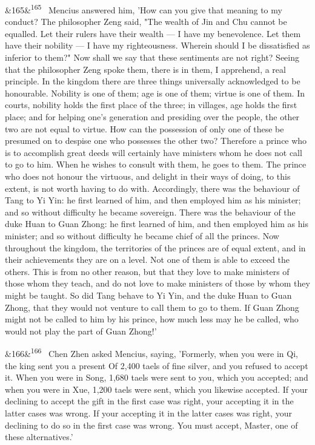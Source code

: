 \documentclass[12pt]{article}
\newcommand{\para}[1][]{\par\noindent\ifx&#1&\else\textsuperscript{\footnotesize #1}~\fi}
\begin{document}
\para[165] Mencius answered him, 'How can you give that meaning to my conduct? The philosopher Zeng said, "The wealth of Jin and Chu cannot be equalled. Let their rulers have their wealth --- I have my benevolence. Let them have their nobility --- I have my righteousness. Wherein should I be dissatisfied as inferior to them?" Now shall we say that these sentiments are not right? Seeing that the philosopher Zeng spoke them, there is in them, I apprehend, a real principle. In the kingdom there are three things universally acknowledged to be honourable. Nobility is one of them; age is one of them; virtue is one of them. In courts, nobility holds the first place of the three; in villages, age holds the first place; and for helping one's generation and presiding over the people, the other two are not equal to virtue. How can the possession of only one of these be presumed on to despise one who possesses the other two? Therefore a prince who is to accomplish great deeds will certainly have ministers whom he does not call to go to him. When he wishes to consult with them, he goes to them. The prince who does not honour the virtuous, and delight in their ways of doing, to this extent, is not worth having to do with. Accordingly, there was the behaviour of Tang to Yi Yin: he first learned of him, and then employed him as his minister; and so without difficulty he became sovereign. There was the behaviour of the duke Huan to Guan Zhong: he first learned of him, and then employed him as his minister; and so without difficulty he became chief of all the princes. Now throughout the kingdom, the territories of the princes are of equal extent, and in their achievements they are on a level. Not one of them is able to exceed the others. This is from no other reason, but that they love to make ministers of those whom they teach, and do not love to make ministers of those by whom they might be taught. So did Tang behave to Yi Yin, and the duke Huan to Guan Zhong, that they would not venture to call them to go to them. If Guan Zhong might not be called to him by his prince, how much less may he be called, who would not play the part of Guan Zhong!'

\para[166] Chen Zhen asked Mencius, saying, 'Formerly, when you were in Qi, the king sent you a present Of 2,400 taels of fine silver, and you refused to accept it. When you were in Song, 1,680 taels were sent to you, which you accepted; and when you were in Xue, 1,200 taels were sent, which you likewise accepted. If your declining to accept the gift in the first case was right, your accepting it in the latter cases was wrong. If your accepting it in the latter cases was right, your declining to do so in the first case was wrong. You must accept, Master, one of these alternatives.'
\end{document}
